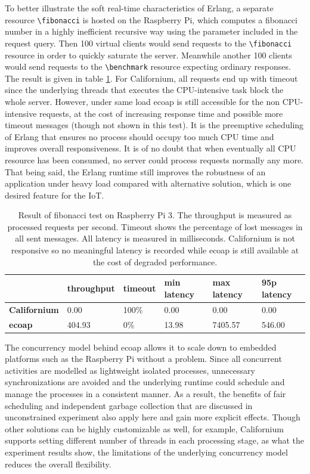 To better illustrate the soft real-time characteristics of Erlang, a separate resource \verb|\fibonacci| is hosted on the Raspberry Pi, which computes a fibonacci number in a highly inefficient recursive way using the parameter included in the request query. Then 100 virtual clients would send requests to the \verb|\fibonacci| resource in order to quickly saturate the server. Meanwhile another 100 clients would send requests to the \verb|\benchmark| resource expecting ordinary responses. The result is given in table \ref{tab:rasp_fib}. For Californium, all requests end up with timeout since the underlying threads that executes the CPU-intensive task block the whole server. However, under same load ecoap is still accessible for the non CPU-intensive requests, at the cost of increasing response time and possible more timeout messages (though not shown in this test). It is the preemptive scheduling of Erlang that ensures no process should occupy too much CPU time and improves overall responsiveness. It is of no doubt that when eventually all CPU resource has been consumed, no server could process requests normally any more. That being said, the Erlang runtime still improves the robustness of an application under heavy load compared with alternative solution, which is one desired feature for the IoT.

\begin{table}[!htbp]
\centering
\begin{tabular}{llllll}
%
 & \bfseries throughput &  \bfseries timeout & \bfseries min latency & \bfseries max latency & \bfseries 95p latency \\\hline
\bfseries Californium & 0.00 & 100\% & 0.00 & 0.00 & 0.00 \\\hline
\bfseries ecoap & 404.93 & 0\% & 13.98 & 7405.57 & 546.00\\
\end{tabular}
\caption[Result of fibonacci test on Raspberry Pi 3]{Result of fibonacci test on Raspberry Pi 3. The throughput is measured as processed requests per second. Timeout shows the percentage of lost messages in all sent messages. All latency is measured in milliseconds. Californium is not responsive so no meaningful latency is recorded while ecoap is still available at the cost of degraded performance.}
\label{tab:rasp_fib}
\end{table}

The concurrency model behind ecoap allows it to scale down to embedded platforms such as the Raspberry Pi without a problem. Since all concurrent activities are modelled as lightweight isolated processes, unnecessary synchronizations are avoided and the underlying runtime could schedule and manage the processes in a consistent manner. As a result, the benefits of fair scheduling and independent garbage collection that are discussed in unconstrained experiment also apply here and gain more explicit effects. Though other solutions can be highly customizable as well, for example, Californium supports setting different number of threads in each processing stage, as what the experiment results show, the limitations of the underlying concurrency model reduces the overall flexibility. 

